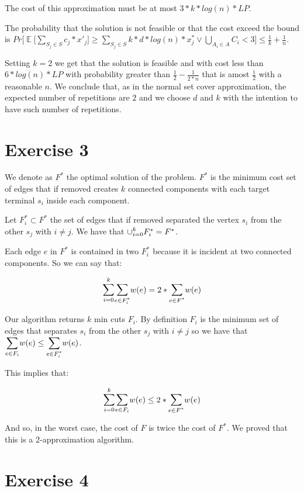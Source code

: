 \documentclass[paper=a4, fontsize=11pt]{scrartcl} %
\numberwithin{equation}{section} %
\numberwithin{figure}{section} %
\numberwithin{table}{section} %
\DeclareMathOperator*{\E}{\mathbb{E}}
\begin{document}
The cost of this approximation must be at most $3*k*log(n)*LP$.

The probability that the solution is not feasible or that the cost exceed the bound is $Pr\Big[\E\big[\sum_{S_j \in S} c_j*x'_j\big] \geq \sum_{S_j \in S} k*d*log(n)*x^*_j \lor \bigcup_{A_i \in A} C_i < 3\Big] \leq \frac{1}{k} + \frac{1}{n}$.

Setting $k = 2$ we get that the solution is feasible and with cost less than $6*log(n)*LP$ with probability greater than $\frac{1}{2} - \frac{1}{2*n}$ that is amost $\frac{1}{2}$ with a reasonable $n$.
We conclude that, as in the normal set cover approximation, the expected number of repetitions are $2$ and we choose $d$ and $k$ with the intention to have such number of repetitions.

\section{Exercise 3}

We denote as $F^*$ the optimal solution of the problem. $F^*$ is the minimum cost set of edges that if removed creates $k$ connected components with each target terminal $s_i$ inside each component.

Let $F_i^* \subset F^*$ the set of edges that if removed separated the vertex $s_i$ from the other $s_j$ with $i \ne j$. We have that $\mathlarger{\cup}_{i = 0}^k F_i^* = F^*$.

Each edge $e$ in $F^*$ is contained in two $F_i^*$ because it is incident at two connected components. So we can say that:

\[
\mathlarger{\sum}_{i = 0}^k \mathlarger{\sum}_{e \in F_i^*} w(e) = 2*\mathlarger{\sum}_{e \in F^*} w(e)
\]

Our algorithm returns $k$ min cuts $F_i$. By definition $F_i$ is the minimum set of edges that separates $s_i$ from the other $s_j$ with $i \ne j$ so we have that $\mathlarger{\sum}_{e \in F_i} w(e) \leq \mathlarger{\sum}_{e \in F_i^*} w(e)$.

This implies that:

\[
\mathlarger{\sum}_{i = 0}^k \mathlarger{\sum}_{e \in F_i} w(e) \leq 2*\mathlarger{\sum}_{e \in F^*} w(e)
\]

And so, in the worst case, the cost of $F$ is twice the cost of $F^*$. We proved that this is a 2-approximation algorithm.

\section{Exercise 4}
\end{document}

